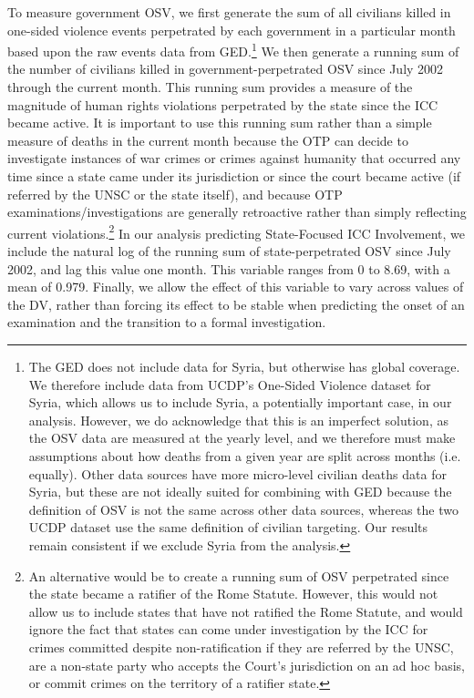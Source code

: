 To measure government OSV, we first generate the sum of all civilians killed in one-sided violence events perpetrated by each government in a particular month based upon the raw events data from GED.\footnote{The GED does not include data for Syria, but otherwise has global coverage. We therefore include data from UCDP's One-Sided Violence dataset \citep{eck2007one} for Syria, which allows us to include Syria, a potentially important case, in our analysis. However, we do acknowledge that this is an imperfect solution, as the OSV data are measured at the yearly level, and we therefore must make assumptions about how deaths from a given year are split across months (i.e. equally). Other data sources have more micro-level civilian deaths data for Syria, but these are not ideally suited for combining with GED because the definition of OSV is not the same across other data sources, whereas the two UCDP dataset use the same definition of civilian targeting. Our results remain consistent if we exclude Syria from the analysis.} We then generate a running sum of the number of civilians killed in government-perpetrated OSV since July 2002 through the current month. This running sum provides a measure of the magnitude of human rights violations perpetrated by the state since the ICC became active. It is important to use this running sum rather than a simple measure of deaths in the current month because the OTP can decide to investigate instances of war crimes or crimes against humanity that occurred any time since a state came under its jurisdiction or since the court became active (if referred by the UNSC or the state itself), and because OTP examinations/investigations are generally retroactive rather than simply reflecting current violations.\footnote{An alternative would be to create a running sum of OSV perpetrated since the state became a ratifier of the Rome Statute. However, this would not allow us to include states that have not ratified the Rome Statute, and would ignore the fact that states can come under investigation by the ICC for crimes committed despite non-ratification if they are referred by the UNSC, are a non-state party who accepts the Court's jurisdiction on an ad hoc basis, or commit crimes on the territory of a ratifier state.} In our analysis predicting State-Focused ICC Involvement, we include the natural log of the running sum of state-perpetrated OSV since July 2002, and lag this value one month. This variable ranges from 0 to 8.69, with a mean of 0.979. Finally, we allow the effect of this variable to vary across values of the DV, rather than forcing its effect to be stable when predicting the onset of an examination and the transition to a formal investigation.


